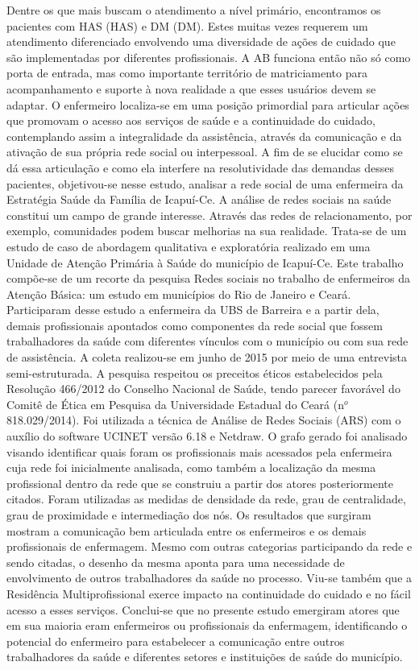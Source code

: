 Dentre os que mais buscam o atendimento a nível primário, encontramos os pacientes com HAS (HAS) e DM (DM). Estes muitas vezes requerem um atendimento diferenciado envolvendo uma diversidade de ações de cuidado que são implementadas por diferentes profissionais. A AB  funciona então não só como porta de entrada, mas como importante território de matriciamento para acompanhamento e suporte à nova realidade a que esses usuários devem se adaptar. O enfermeiro  localiza-se em uma posição primordial para articular ações que promovam o acesso aos serviços de saúde e a continuidade do cuidado, contemplando assim a integralidade da assistência, através da comunicação e da ativação de sua própria rede social ou interpessoal. A fim de se elucidar como se dá essa articulação e como ela interfere na resolutividade das demandas desses pacientes, objetivou-se nesse estudo, analisar a rede social de uma enfermeira da Estratégia Saúde da Família de Icapuí-Ce. A análise de redes sociais na saúde constitui um campo de grande interesse. Através das redes de relacionamento, por exemplo, comunidades podem buscar melhorias na sua realidade. Trata-se de um estudo de caso de abordagem qualitativa e exploratória realizado em uma Unidade de Atenção Primária à Saúde do município de Icapuí-Ce. Este trabalho compõe-se de um recorte da pesquisa Redes sociais no trabalho de enfermeiros da Atenção Básica: um estudo em municípios do Rio de Janeiro e Ceará. Participaram desse estudo a enfermeira da UBS de Barreira e a partir dela, demais profissionais apontados como componentes da rede social que fossem trabalhadores da saúde com diferentes vínculos com o município ou com sua rede de assistência. A coleta realizou-se em junho de 2015 por meio de  uma entrevista semi-estruturada. A pesquisa respeitou os preceitos éticos estabelecidos pela Resolução 466/2012 do Conselho Nacional de Saúde, tendo parecer favorável do Comitê de Ética em Pesquisa da Universidade Estadual do Ceará (n$^o$ 818.029/2014).  Foi utilizada a técnica de Análise de Redes Sociais (ARS) com o auxílio do software UCINET versão 6.18 e Netdraw. O grafo gerado foi analisado visando identificar quais foram os profissionais mais acessados pela enfermeira cuja rede foi inicialmente analisada, como também a localização da mesma profissional dentro da rede que se construiu a partir dos atores posteriormente citados. Foram utilizadas as medidas de densidade da rede, grau de centralidade, grau de proximidade e intermediação dos nós. Os resultados que surgiram mostram a comunicação bem articulada entre os enfermeiros e os demais profissionais de enfermagem. Mesmo com outras categorias participando da rede e sendo citadas, o desenho da mesma aponta para uma necessidade de envolvimento de outros trabalhadores da saúde no processo. Viu-se também que a Residência Multiprofissional exerce impacto na continuidade do cuidado e no fácil acesso a esses serviços. Conclui-se que no presente estudo emergiram atores que em sua maioria eram enfermeiros ou profissionais da enfermagem, identificando o potencial do enfermeiro para estabelecer a comunicação entre outros trabalhadores da saúde e diferentes setores e instituições de saúde do município.

